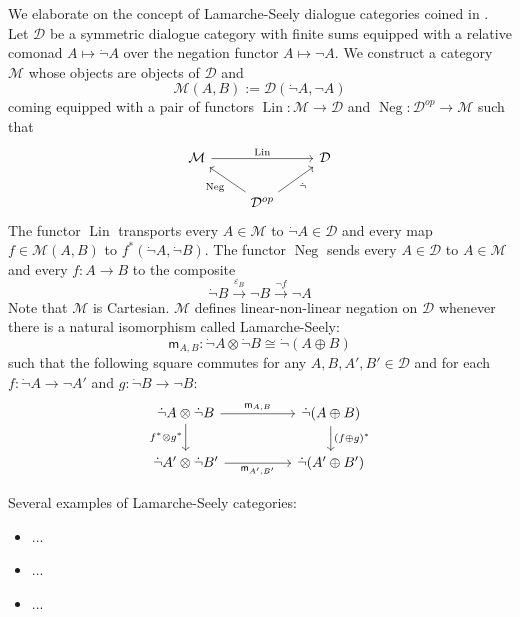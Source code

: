 \documentclass[8pt]{article}
\theoremstyle{definition}
\theoremstyle{definition}
\theoremstyle{definition}
\theoremstyle{definition}
\theoremstyle{definition}
\theoremstyle{definition}
\theoremstyle{definition}
\theoremstyle{definition}
\theoremstyle{definition}
\theoremstyle{definition}
\theoremstyle{definition}
\theoremstyle{definition}
\theoremstyle{definition}
\theoremstyle{definition}
\theoremstyle{question}
\begin{document}
\vspace{\baselineskip}

We elaborate on the concept of Lamarche-Seely dialogue categories coined in \cite{mellies2026story}.
Let $\mathcal{D}$ be a symmetric dialogue category with finite sums equipped with a relative comonad
$A \mapsto \dot{\neg} A$ over the negation functor $A \mapsto \neg A$. We construct a category $\mathcal{M}$
whose objects are objects of $\mathcal{D}$ and
\[
\mathcal{M}(A, B) := \mathcal{D}(\dot{\neg} A, \neg A)
\]
coming equipped with a pair of functors $\operatorname{Lin} : \mathcal{M} \to \mathcal{D}$ and
$\operatorname{Neg} : \mathcal{D}^{op} \to \mathcal{M}$ such that
\[
\begin{tikzcd}
  \mathcal{M} \ar[rr, "\operatorname{Lin}"] && \mathcal{D} \\
  & \mathcal{D}^{op} \ar[ul, "\operatorname{Neg}"] \ar[ur, "\dot{\neg}"']
\end{tikzcd}
\]
The functor $\operatorname{Lin}$ transports every $A \in \mathcal{M}$ to $\dot{\neg} A \in \mathcal{D}$
and every map $f \in \mathcal{M}(A, B)$ to $f^{*}(\dot{\neg} A, \dot{\neg} B)$. The functor 
$\operatorname{Neg}$ sends every $A \in \mathcal{D}$ to $A \in \mathcal{M}$ and every $f : A \to B$ to the composite
\[
\dot{\neg} B \xrightarrow{\varepsilon_B} \neg B \xrightarrow{\neg f} \neg A
\]
Note that $\mathcal{M}$ is Cartesian.  $\mathcal{M}$ defines linear-non-linear negation on $\mathcal{D}$
whenever there is a natural isomorphism called Lamarche-Seely:
\[
\mathsf{m}_{A,B} : \dot{\neg} A \otimes \dot{\neg} B \cong \dot{\neg} (A \oplus B)
\]
such that the following square commutes for any $A, B, A',B' \in \mathcal{D}$
and for each $f : \dot{\neg} A \to \neg A'$ and $g : \dot{\neg} B \to \neg B$:
\[
\begin{tikzcd}
  \dot{\neg} A \otimes \dot{\neg} B \ar[rr, "\mathsf{m}_{A,B}"] \ar[d, "f^* \otimes g^*"'] && \dot{\neg} (A \oplus B) \ar[d, "(f \oplus g)^*"] \\
  \dot{\neg} A' \otimes \dot{\neg} B' \ar[rr, "\mathsf{m}_{A',B'}"'] && \dot{\neg} (A' \oplus B')
\end{tikzcd}
\]

Several examples of Lamarche-Seely categories:
\begin{itemize}
  \item ...
  \item ...
  \item ...
\end{itemize}
\end{document}
